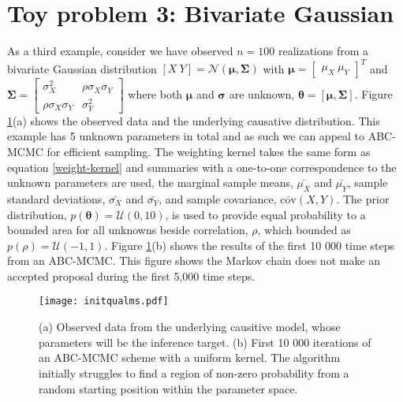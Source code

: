 \section{Toy problem 3: Bivariate Gaussian}
As a third example, consider we have observed $n = 100$ realizations from a bivariate Gaussian distribution $[X\ Y] = \mathcal{N}(\bm{\mu},\bm{\Sigma})$ with $\bm{\mu} = \begin{bmatrix}
\mu_X\ \mu_Y
\end{bmatrix}^T$ and $\bm{\Sigma} = \begin{bmatrix}
\sigma^2_X & \rho\sigma_X\sigma_Y\\
\rho\sigma_X\sigma_Y & \sigma^2_Y
\end{bmatrix} $ where both $\bm{\mu}$ and $\bm{\sigma}$ are unknown, $\bm{\theta} = [\bm{\mu},\bm{\Sigma}]$. Figure \ref{init-qualms}(a) shows the observed data and the underlying causative distribution. This example has 5 unknown parameters in total and as such we can appeal to ABC-MCMC for efficient sampling. The weighting kernel takes the same form as equation \ref{weight-kernel} and summaries with a one-to-one correspondence to the unknown parameters are used, the marginal sample means, $\bar{\mu_X}$ and $\bar{\mu_Y}$, sample standard deviations, $\bar{\sigma_X}$ and $\bar{\sigma_Y}$, and sample covariance, $\bar{\text{cov}}(X,Y)$. The prior distribution, $p(\bm{\theta}) = \mathcal{U}(0,10)$, is used to provide equal probability to a bounded area for all unknowns beside correlation, $\rho$, which bounded as $p(\rho) = \mathcal{U}(-1,1)$. Figure \ref{init-qualms}(b) shows the results of the first 10 000 time steps from an ABC-MCMC. This figure shows the Markov chain does not make an accepted proposal during the first 5,000 time steps.
\begin{figure}[H]
	\centering
	\texttt{[image: initqualms.pdf]}
	\caption{(a) Observed data from the underlying causitive model, whose parameters will be the inference target. (b) First 10 000 iterations of an ABC-MCMC scheme with a uniform kernel. The algorithm initially struggles to find a region of non-zero probability from a random starting position within the parameter space.}
	\label{init-qualms}
\end{figure}

